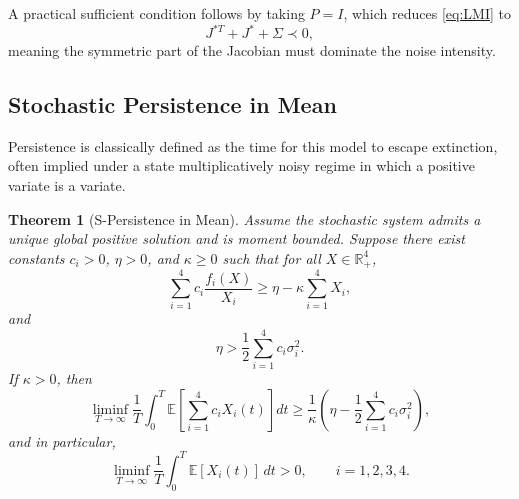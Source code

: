 \documentclass[11pt]{article}
\numberwithin{equation}{section}
\newtheorem{theorem}{Theorem}[section]
\begin{document}
A practical sufficient condition follows by taking $P=I$, which reduces \eqref{eq:LMI} to
\[
J^{*T}+J^*+\Sigma \prec 0,
\]
meaning the symmetric part of the Jacobian must dominate the noise intensity.

\subsection{Stochastic Persistence in Mean}

Persistence is classically defined as the time for this model to escape extinction, often implied under a state multiplicatively noisy regime in which a positive variate is a variate.

\begin{theorem}[S-Persistence in Mean]\label{thm:P-S in Mean}
    Assume the stochastic system admits a unique global positive solution and is moment bounded. Suppose there exist constants $c_i>0$, $\eta>0$, and $\kappa\ge 0$ such that for all $X\in\mathbb{R}_+^4$,
\begin{equation}\label{eq:persist_drift}
\sum_{i=1}^4 c_i\frac{f_i(X)}{X_i}\ge \eta-\kappa\sum_{i=1}^4 X_i,
\end{equation}
and
\begin{equation}\label{eq:persist_noise}
\eta>\frac{1}{2}\sum_{i=1}^4 c_i\sigma_i^2.
\end{equation}
If $\kappa>0$, then
\begin{equation}\label{eq:persist_bound}
\liminf_{T\to\infty}\frac{1}{T}\int_0^T
\mathbb{E}\left[\sum_{i=1}^4 c_iX_i(t)\right]dt
\ge \frac{1}{\kappa}\left(\eta-\frac{1}{2}\sum_{i=1}^4 c_i\sigma_i^2\right),
\end{equation}
and in particular,
\[
\liminf_{T\to\infty}\frac{1}{T}\int_0^T \mathbb{E}[X_i(t)]\,dt>0,\qquad i=1,2,3,4.
\]
\end{theorem}
\end{document}
